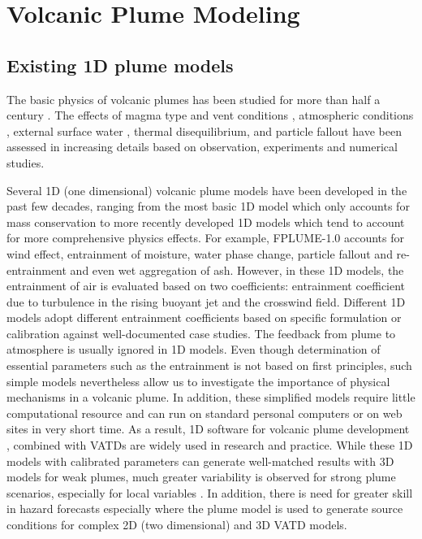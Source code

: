 \section{Volcanic Plume Modeling}
\subsection{Existing 1D plume models}
The basic physics of volcanic plumes has been studied for more than half a century \citep{morton1956turbulent, settle1978volcanic, wilson1978control}. The effects of magma type and vent conditions \citep{woods1988fluid, woods1995decompression}, atmospheric conditions \citep{ woods1993moist, sparks1997volcanic, bursik2001effect}, external surface water \citep{koyaguchi1996formation}, thermal disequilibrium, and particle fallout \citep{woods1991particle} have been assessed in increasing details based on observation, experiments and numerical studies.

Several 1D (one dimensional) volcanic plume models have been developed in the past few decades, ranging from the most basic 1D model \citep{woods1988fluid} which only accounts for mass conservation to more recently developed 1D models  \citep{bursik2001effect, mastin2007user, degruyter2012improving, woodhouse2013interaction, devenish2013using, girault2014effect, de2015plume, vitturi2015plume, folch2016fplume, pouget2016sensitivity} which tend to account for more comprehensive physics effects. 
For example, FPLUME-1.0 \citep{folch2016fplume} accounts for wind effect, entrainment of moisture, water phase change, particle fallout and re-entrainment and even wet aggregation of ash. However, in these 1D models, the entrainment of air is evaluated based on two coefficients: entrainment coefficient due to turbulence in the rising buoyant jet and the crosswind field. Different 1D models adopt different entrainment coefficients based on specific formulation or calibration against well-documented case studies. The feedback from plume to atmosphere is usually ignored in 1D models. Even though determination of essential parameters such as the entrainment is not based on first principles, such simple models nevertheless allow us to investigate the importance of physical mechanisms in a volcanic plume. In addition, these simplified models require little computational resource and can run on standard personal computers or on web sites in very short time. As a result, 1D software for volcanic plume development \citep[such as][]{267, 1194, 3541}, combined with VATDs \citep[such as][]{114} are widely used in research and practice. While these 1D models with calibrated parameters can generate well-matched results with 3D models for weak plumes, much greater variability is observed for strong plume scenarios, especially for local variables \citep{costa2016results}. In addition, there is need for greater skill in hazard forecasts especially where the plume model is used to generate source conditions for complex 2D (two dimensional) and 3D VATD models.

